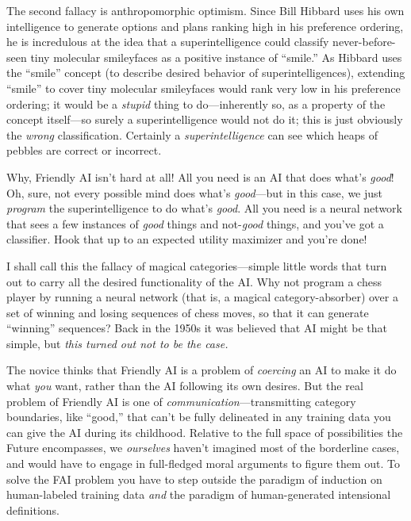 {
 The second fallacy is anthropomorphic optimism. Since Bill Hibbard
uses his own intelligence to generate options and plans ranking high in
his preference ordering, he is incredulous at the idea that a
superintelligence could classify never-before-seen tiny molecular
smileyfaces as a positive instance of
``smile.'' As Hibbard uses the
``smile'' concept (to describe
desired behavior of superintelligences), extending
``smile'' to cover tiny molecular
smileyfaces would rank very low in his preference ordering; it would be
a \textit{stupid} thing to do---inherently so, as a property of the
concept itself---so surely a superintelligence would not do it; this is
just obviously the \textit{wrong} classification. Certainly a
\textit{superintelligence} can see which heaps of pebbles are correct
or incorrect.}

{
 Why, Friendly AI isn't hard at all! All you need
is an AI that does what's \textit{good}! Oh, sure, not
every possible mind does what's \textit{good}{}---but
in this case, we just \textit{program} the superintelligence to do
what's \textit{good}. All you need is a neural network
that sees a few instances of \textit{good} things and not-\textit{good}
things, and you've got a classifier. Hook that up to an
expected utility maximizer and you're done!}

{
 I shall call this the fallacy of magical categories---simple
little words that turn out to carry all the desired functionality of
the AI. Why not program a chess player by running a neural network
(that is, a magical category-absorber) over a set of winning and losing
sequences of chess moves, so that it can generate
``winning'' sequences? Back in the
1950s it was believed that AI might be that simple, but \textit{this
turned out not to be the case.}}

{
 The novice thinks that Friendly AI is a problem of
\textit{coercing} an AI to make it do what \textit{you} want, rather
than the AI following its own desires. But the real problem of Friendly
AI is one of \textit{communication}{}---transmitting category
boundaries, like ``good,'' that
can't be fully delineated in any training data you can
give the AI during its childhood. Relative to the full space of
possibilities the Future encompasses, we \textit{ourselves}
haven't imagined most of the borderline cases, and
would have to engage in full-fledged moral arguments to figure them
out. To solve the FAI problem you have to step outside the paradigm of
induction on human-labeled training data \textit{and} the paradigm of
human-generated intensional definitions.}

